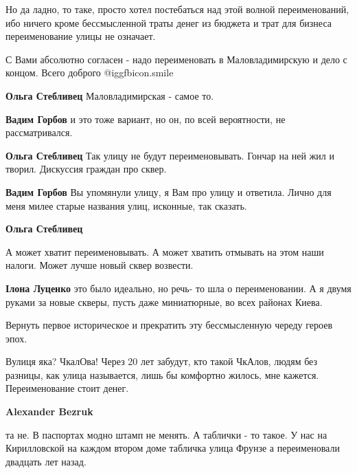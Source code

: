 \begin{itemize}
\begin{itemize}
\begin{itemize}
Но да ладно, то таке, просто хотел постебаться над этой волной переименований,
ибо ничего кроме бессмысленной траты денег из бюджета и трат для бизнеса
переименование улицы не означает.

С Вами абсолютно согласен - надо переименовать в Маловладимирскую и дело с
концом. Всего доброго  @igg{fbicon.smile} 

\end{itemize} %

\textbf{Ольга Стебливец} Маловладимирская - самое то.

\begin{itemize} %
\textbf{Вадим Горбов} и это тоже вариант, но он, по всей вероятности, не рассматривался.

\textbf{Ольга Стебливец} Так улицу не будут переименовывать. Гончар на ней жил и творил. Дискуссия граждан про сквер.

\textbf{Вадим Горбов} Вы упомянули улицу, я Вам про улицу и ответила. Лично для меня милее старые названия улиц, исконные, так сказать.
\end{itemize} %

\textbf{Ольга Стебливец} 

А может хватит переименовывать. А может хватить отмывать на этом наши налоги.
Может лучше новый сквер возвести.

\begin{itemize} %
\textbf{Ілона Луценко} это было идеально, но речь- то шла о переименовании.
А я двумя руками за новые скверы, пусть даже миниатюрные, во всех районах Киева.
\end{itemize} %

\end{itemize} %

Вернуть первое историческое и прекратить эту бессмысленную череду героев эпох.

Вулиця яка? ЧкалОва!
Через 20 лет забудут, кто такой ЧкАлов, людям без разницы, как улица называется, лишь бы комфортно жилось, мне кажется.
Переименование стоит денег.

\begin{itemize} %
\textbf{Alexander Bezruk} 

та не. В паспортах модно штамп не менять. А таблички - то такое. У нас на
Кирилловской на каждом втором доме табличка улица Фрунзе а переименовали
двадцать лет назад.


\end{itemize}
\end{itemize}

